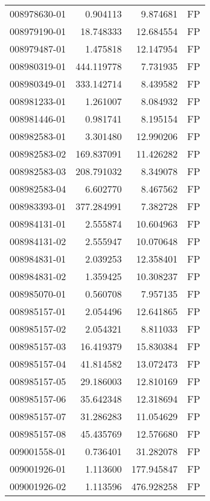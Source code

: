 \begin{tabular}{lrrl}
008978630-01 &    0.904113 &       9.874681 &   FP \\
008979190-01 &   18.748333 &      12.684554 &   FP \\
008979487-01 &    1.475818 &      12.147954 &   FP \\
008980319-01 &  444.119778 &       7.731935 &   FP \\
008980349-01 &  333.142714 &       8.439582 &   FP \\
008981233-01 &    1.261007 &       8.084932 &   FP \\
008981446-01 &    0.981741 &       8.195154 &   FP \\
008982583-01 &    3.301480 &      12.990206 &   FP \\
008982583-02 &  169.837091 &      11.426282 &   FP \\
008982583-03 &  208.791032 &       8.349078 &   FP \\
008982583-04 &    6.602770 &       8.467562 &   FP \\
008983393-01 &  377.284991 &       7.382728 &   FP \\
008984131-01 &    2.555874 &      10.604963 &   FP \\
008984131-02 &    2.555947 &      10.070648 &   FP \\
008984831-01 &    2.039253 &      12.358401 &   FP \\
008984831-02 &    1.359425 &      10.308237 &   FP \\
008985070-01 &    0.560708 &       7.957135 &   FP \\
008985157-01 &    2.054496 &      12.641865 &   FP \\
008985157-02 &    2.054321 &       8.811033 &   FP \\
008985157-03 &   16.419379 &      15.830384 &   FP \\
008985157-04 &   41.814582 &      13.072473 &   FP \\
008985157-05 &   29.186003 &      12.810169 &   FP \\
008985157-06 &   35.642348 &      12.318694 &   FP \\
008985157-07 &   31.286283 &      11.054629 &   FP \\
008985157-08 &   45.435769 &      12.576680 &   FP \\
009001558-01 &    0.736401 &      31.282078 &   FP \\
009001926-01 &    1.113600 &     177.945847 &   FP \\
009001926-02 &    1.113596 &     476.928258 &   FP \\

\end{tabular}
